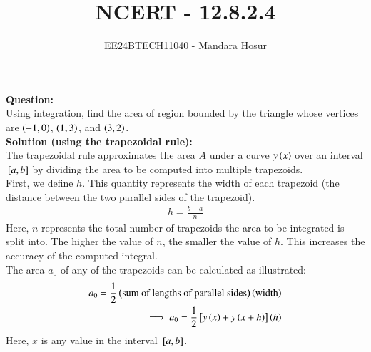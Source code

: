 \documentclass[journal]{IEEEtran}
\begin{document}

\vspace{3cm}

\title{NCERT - 12.8.2.4}
\author{EE24BTECH11040 - Mandara Hosur}
{\let\newpage\relax\maketitle}

\renewcommand{\thefigure}{\theenumi}
\renewcommand{\thetable}{\theenumi}
\setlength{\intextsep}{10pt} %


\renewcommand{\thetable}{\theenumi}

\textbf{Question:}\\
Using integration, find the area of region bounded by the triangle whose vertices are $\left(-1,0\right)$, $\left(1,3\right)$, and $\left(3,2\right)$. \\

\textbf{Solution (using the trapezoidal rule):} \\
The trapezoidal rule approximates the area $A$ under a curve $y\left(x\right)$ over an interval ${}\left[a,b\right]$ by dividing the area to be computed into multiple trapezoids. \\

First, we define $h$. This quantity represents the width of each trapezoid (the distance between the two parallel sides of the trapezoid).
\begin{align}
h = \frac{b-a}{n}
\end{align}
Here, $n$ represents the total number of trapezoids the area to be integrated is split into. The higher the value of $n$, the smaller the value of $h$. This increases the accuracy of the computed integral. \\

The area $a_0$ of any of the trapezoids can be calculated as illustrated:
\begin{align}
a_0 = \frac{1}{2} \left(\text{sum of lengths of parallel sides}\right) \left(\text{width}\right) \\
\implies a_0 = \frac{1}{2} {}\left[y\left(x\right) + y\left(x + h\right)\right] \left(h\right)
\end{align}
Here, $x$ is any value in the interval ${}\left[a,b\right]$. \\
\end{document}
